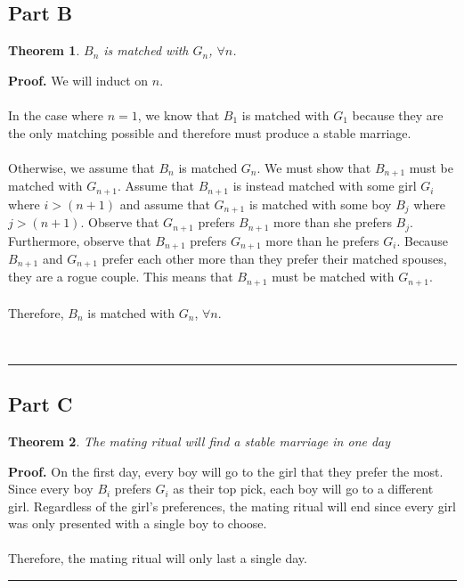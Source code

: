 \documentclass{article}%
\newtheorem{theorem}{Theorem}
\newenvironment{proof}[1][Proof]{\noindent\textbf{#1.} }{\ \rule{0.5em}{0.5em}}
\begin{document}
\subsection{Part B}
\begin{theorem}
$B_n$ is matched with $G_n$, $\forall n$.
\end{theorem}

\begin{proof}
We will induct on $n$.\\ \\
In the case where $n=1$, we know that $B_1$ is matched with $G_1$ because they are the only matching possible and therefore must produce a stable marriage. \\ \\
Otherwise, we assume that $B_n$ is matched $G_n$. We must show that $B_{n+1}$ must be matched with $G_{n+1}$. Assume that $B_{n+1}$ is instead matched with some girl $G_i$ where $i > (n+1)$ and assume that $G_{n+1}$ is matched with some boy $B_j$ where $j > (n+1)$. Observe that $G_{n+1}$ prefers $B_{n+1}$ more than she prefers $B_j$. Furthermore, observe that $B_{n+1}$ prefers $G_{n+1}$ more than he prefers $G_i$. Because $B_{n+1}$ and $G_{n+1}$ prefer each other more than they prefer their matched spouses, they are a rogue couple. This means that $B_{n+1}$ must be matched with $G_{n+1}$.\\ \\
    Therefore, $B_n$ is matched with $G_n$, $\forall n$.

\end{proof}

\subsection{Part C}
\begin{theorem}
The mating ritual will find a stable marriage in one day
\end{theorem}

\begin{proof}
    On the first day, every boy will go to the girl that they prefer the most. Since every boy $B_i$ prefers $G_i$ as their top pick, each boy will go to a different girl. Regardless of the girl's preferences, the mating ritual will end since every girl was only presented with a single boy to choose. \\ \\
    Therefore, the mating ritual will only last a single day.
\end{proof}
\end{document}
